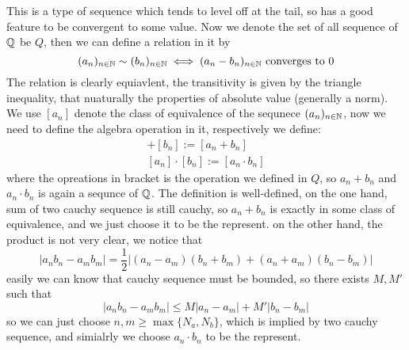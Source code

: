 \documentclass[en,geye,blue,normal,12pt]{elegantnote}
\begin{document}
This is a type of sequence which tends to level off at the tail, so has a good feature to be convergent to some value. Now we denote the set of all sequence of \(\mathbb{Q}\) be \(Q\), then we can define a relation in it by
\[(a_n)_{n \in \mathbb{N}} \sim (b_n)_{n \in \mathbb{N}} \iff (a_n-b_n)_{n \in \mathbb{N}} \text{ converges to 0}\]
The relation is clearly equiavlent, the transitivity is given by the triangle inequality, that nuaturally the properties of absolute value (generally a norm). We use \([a_n]\) denote the class of equivalence of the sequnece \((a_n)_{n \in \mathbb{N}}\), now we need to define the algebra operation in it, respectively we define:
\begin{align*}
  [a_n]+[b_n] := [a_n+b_n]\\
  [a_n]\cdot[b_n] := [a_n \cdot b_n]
\end{align*}
where the opreations in bracket is the operation we defined in \(Q\), so \(a_n+b_n\) and \(a_n \cdot b_n\) is again a sequnce of \(\mathbb{Q}\). The definition is well-defined, on the one hand, sum of two cauchy sequence is still cauchy, so \(a_n + b_n\) is exactly in some class of equivalence, and we just choose it to be the represent.  on the other hand, the product is not very clear, we notice that 
\[|a_nb_n-a_mb_m| = \frac{1}{2}|(a_n-a_m)(b_n+b_m)+(a_n+a_m)(b_n-b_m)|\]
easily we can know that cauchy sequence must be bounded, so there exists \(M,M'\) such that 
\[|a_nb_n-a_mb_m| \leq M|a_n-a_m|+M'|b_n-b_m|\]
so we can just choose \(n,m \geq \max\{N_a,N_b\}\), which is implied by two cauchy sequence, and simialrly we choose \(a_n \cdot b_n\) to be the represent.
\end{document}
